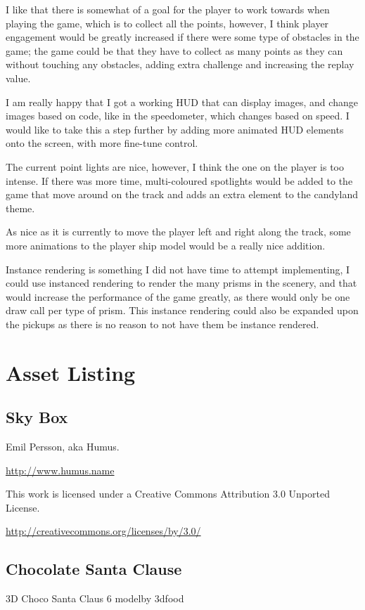 \documentclass[11pt]{report}
\begin{document}
I like that there is somewhat of a goal for the player to work towards when playing the game, which is to collect all the points, however, I think player engagement would be greatly increased if there were some type of obstacles in the game; the game could be that they have to collect as many points as they can without touching any obstacles, adding extra challenge and increasing the replay value.

I am really happy that I got a working HUD that can display images, and change images based on code, like in the speedometer, which changes based on speed. I would like to take this a step further by adding more animated HUD elements onto the screen, with more fine-tune control.

The current point lights are nice, however, I think the one on the player is too intense. If there was more time, multi-coloured spotlights would be added to the game that move around on the track and adds an extra element to the candyland theme.

As nice as it is currently to move the player left and right along the track, some more animations to the player ship model would be a really nice addition.

Instance rendering is something I did not have time to attempt implementing, I could use instanced rendering to render the many prisms in the scenery, and that would increase the performance of the game greatly, as there would only be one draw call per type of prism. This instance rendering could also be expanded upon the pickups as there is no reason to not have them be instance rendered.

\newpage
\section*{Asset Listing}
\subsection*{Sky Box}
Emil Persson, aka Humus.

\url{http://www.humus.name}

This work is licensed under a Creative Commons Attribution 3.0 Unported License.

\url{http://creativecommons.org/licenses/by/3.0/}

\subsection*{Chocolate Santa Clause}
3D Choco Santa Claus 6 modelby 3dfood
\end{document}
